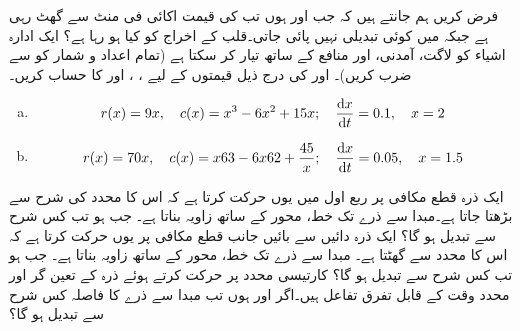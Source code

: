 فرض کریں  ہم جانتے ہیں کہ جب  اور  ہوں تب  کی قیمت  اکائی فی منٹ سے گھٹ رہی ہے جبکہ  میں کوئی تبدیلی نہیں پائی جاتی۔قلب کے اخراج کو کیا ہو رہا ہے؟
\quad
ایک ادارہ  اشیاء کو  لاگت،  آمدنی،  اور  منافع کے ساتھ تیار کر سکتا ہے (تمام اعداد و شمار کو  سے ضرب کریں)۔ اور  کی درج ذیل قیمتوں کے لیے ، ،  اور  کا حساب کریں۔ 
\begin{enumerate}[a.]
\item
\begin{align*}
r(x)=9x,\quad c(x)=x^3-6x^2+15x;\quad  \frac{\dif x}{\dif t}=0.1,\quad x=2
\end{align*}
\item
\begin{align*}
r(x)=70x,\quad c(x)=x63-6x62+\frac{45}{x};\quad \frac{\dif x}{\dif t}=0.05,\quad x=1.5
\end{align*}
\end{enumerate} 
\quad
ایک ذرہ  قطع مکافی  پر ربع اول میں یوں حرکت کرتا ہے کہ اس کا  محدد  کی شرح سے بڑھتا جاتا ہے۔مبدا سے ذرے تک خط، محور  کے ساتھ زاویہ  بناتا ہے۔ جب  ہو تب   کس شرح سے تبدیل ہو گا؟
\quad
ایک ذرہ دائیں سے بائیں جانب قطع مکافی  پر یوں  حرکت کرتا ہے کہ اس کا  محدد  سے گھٹتا ہے۔ مبدا سے ذرے تک خط، محور  کے ساتھ زاویہ  بناتا ہے۔ جب  ہو تب   کس شرح سے تبدیل ہو گا؟
\quad 
کارتیسی محدد پر حرکت کرتے ہوئے ذرہ کے  تعین گر  اور  محدد وقت  کے قابل تفرق تفاعل ہیں۔اگر  اور  ہوں تب مبدا سے ذرے کا فاصلہ کس شرح سے تبدیل ہو گا؟
